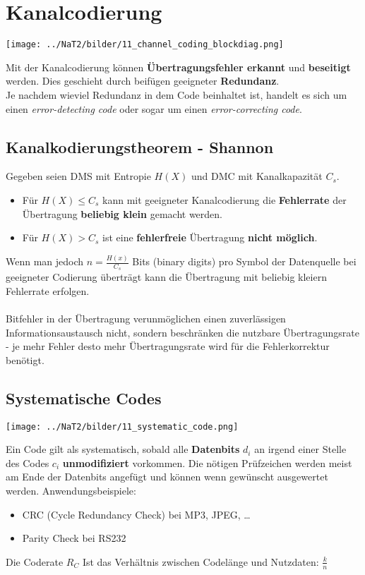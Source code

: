 \section{Kanalcodierung } 
\begin{center}
	\texttt{[image: ../NaT2/bilder/11\_channel\_coding\_blockdiag.png]}
\end{center}

Mit der Kanalcodierung können \textbf{Übertragungsfehler erkannt} und \textbf{beseitigt} werden.
Dies geschieht durch beifügen geeigneter \textbf{Redundanz}. \\
Je nachdem wieviel Redundanz in dem Code beinhaltet ist, handelt es sich um einen \textit{error-detecting
code} oder sogar um einen \textit{error-correcting code}.

\subsection{Kanalkodierungstheorem - Shannon }
Gegeben seien DMS mit Entropie $H(X)$ und DMC mit Kanalkapazität $C_s$. 

\begin{itemize}
  	\item Für $H(X) \leq C_s$ kann mit geeigneter Kanalcodierung die \textbf{Fehlerrate} der
  	Übertragung \textbf{beliebig klein} gemacht werden. 
	\item Für $H(X) > C_s$ ist eine \textbf{fehlerfreie} Übertragung \textbf{nicht möglich}.
\end{itemize}
Wenn man jedoch $n = \frac{H(x)}{C_s}$ Bits (binary digits) pro Symbol der Datenquelle bei
geeigneter Codierung überträgt kann die Übertragung mit beliebig kleiern Fehlerrate erfolgen. \\ \\
Bitfehler in der Übertragung verunmöglichen einen zuverlässigen Informationsaustausch nicht,
sondern beschränken die nutzbare Übertragungsrate - je mehr Fehler desto mehr Übertragungsrate
wird für die Fehlerkorrektur benötigt. \\

\subsection{Systematische Codes}
\begin{minipage}{5.5cm}
	\texttt{[image: ../NaT2/bilder/11\_systematic\_code.png]}
\end{minipage}
\begin{minipage}{12.8cm}
	Ein Code gilt als systematisch, sobald alle \textbf{Datenbits} $d_i$ an irgend einer Stelle des Codes $c_i$
	\textbf{unmodifiziert} vorkommen. Die nötigen Prüfzeichen werden meist am Ende
	der Datenbits angefügt und können wenn gewünscht ausgewertet werden. Anwendungsbeispiele:
	\begin{itemize}
    	\item CRC (Cycle Redundancy Check) bei MP3, JPEG, \ldots
    	\item Parity Check bei RS232
  	\end{itemize}	
	Die Coderate $R_C$ Ist das Verhältnis zwischen Codelänge und Nutzdaten: $\frac{k}{n}$
\end{minipage} 


